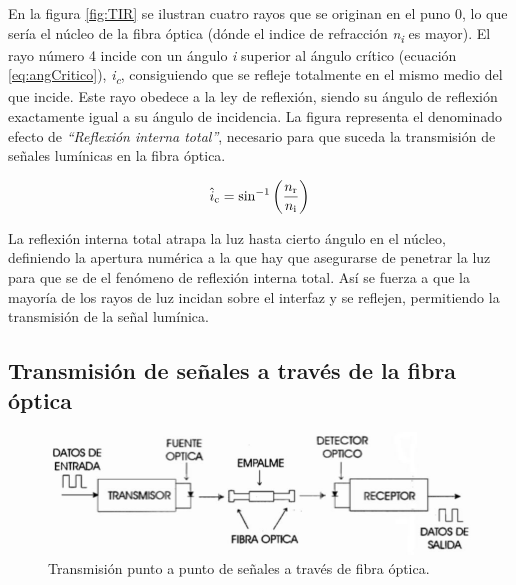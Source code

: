  En la figura \ref{fig:TIR} se ilustran cuatro rayos que se originan en el puno 0, lo que sería el núcleo de la fibra óptica (dónde el indice de refracción \textit{n\textsubscript{i}} es mayor). 
 El rayo número 4 incide con un ángulo \textit{i} superior al ángulo crítico (ecuación \ref{eq:angCritico}), \textit{i\textsubscript{c}}, consiguiendo que se refleje totalmente en el mismo medio del que incide. Este rayo obedece a la ley de reflexión, siendo su ángulo de reflexión exactamente igual a su ángulo de incidencia. La figura representa el denominado efecto de \textit{``Reflexión interna total''}, necesario para que suceda la transmisión de señales lumínicas en la fibra óptica. 

	\begin{equation}
		\label{eq:angCritico}
		\hat{i}\textsubscript{c} =  \sin^{-1}\left(\dfrac{n\textsubscript{r}}{n\textsubscript{i}}\right)
	\end{equation}

 La reflexión interna total atrapa la luz hasta cierto ángulo en el núcleo, definiendo la apertura numérica a la que hay que asegurarse de penetrar la luz para que se de el fenómeno de reflexión interna total. Así se fuerza a que la mayoría de los rayos de luz incidan sobre el interfaz y se reflejen, permitiendo la transmisión de la señal lumínica. 
 
 \subsection{Transmisión de señales a través de la fibra óptica} %
 \label{sec:transmision3}
 
   \begin{figure}[H]
 	\centering
 	\includegraphics[width=1\textwidth]{./img/TxFOp2p}
 	\caption{Transmisión punto a punto de señales a través de fibra óptica. \cite{txFO} } 
 	\label{fig:TxFOp2p}
 \end{figure} 
 
